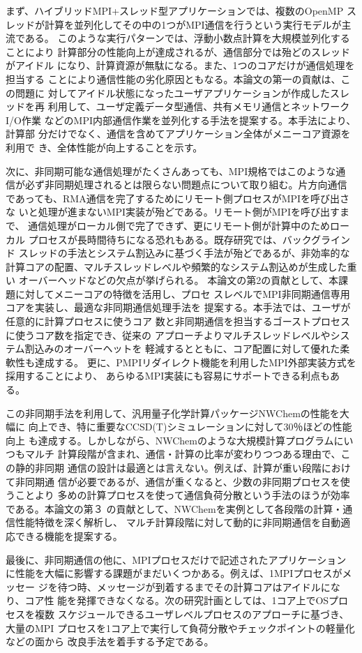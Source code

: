 まず、ハイブリッドMPI+スレッド型アプリケーションでは、複数のOpenMP
スレッドが計算を並列化してその中の1つがMPI通信を行うという実行モデルが主流である。
このような実行パターンでは、浮動小数点計算を大規模並列化することにより
計算部分の性能向上が達成されるが、通信部分では殆どのスレッドがアイドル
になり、計算資源が無駄になる。また、1つのコアだけが通信処理を担当する
ことにより通信性能の劣化原因ともなる。本論文の第一の貢献は、この問題に
対してアイドル状態になったユーザアプリケーションが作成したスレッドを再
利用して、ユーザ定義データ型通信、共有メモリ通信とネットワークI/O作業
などのMPI内部通信作業を並列化する手法を提案する。本手法により、計算部
分だけでなく、通信を含めてアプリケーション全体がメニーコア資源を利用で
き、全体性能が向上することを示す。

次に、非同期可能な通信処理がたくさんあっても、MPI規格ではこのような通
信が必ず非同期処理されるとは限らない問題点について取り組む。片方向通信
であっても、RMA通信を完了するためにリモート側プロセスがMPIを呼び出さな
いと処理が進まないMPI実装が殆どである。リモート側がMPIを呼び出すまで、
通信処理がローカル側で完了できず、更にリモート側が計算中のためローカル
プロセスが長時間待ちになる恐れもある。既存研究では、バックグラインド
スレッドの手法とシステム割込みに基づく手法が殆どであるが、非効率的な
計算コアの配置、マルチスレッドレベルや頻繁的なシステム割込めが生成した重い
オーバーヘッドなどの欠点が挙げられる。
本論文の第2の貢献として、本課題に対してメニーコアの特徴を活用し、プロセ
スレベルでMPI非同期通信専用コアを実装し、最適な非同期通信処理手法を
提案する。本手法では、ユーザが任意的に計算プロセスに使うコア
数と非同期通信を担当するゴーストプロセスに使うコア数を指定でき、従来の
アプローチよりマルチスレッドレベルやシステム割込みのオーバーヘットを
軽減するとともに、コア配置に対して優れた柔軟性も達成する。
更に、PMPIリダイレクト機能を利用したMPI外部実装方式を採用することにより、
あらゆるMPI実装にも容易にサポートできる利点もある。

この非同期手法を利用して、汎用量子化学計算パッケージNWChemの性能を大幅に
向上でき、特に重要なCCSD(T)シミュレーションに対して30％ほどの性能向上
も達成する。しかしながら、NWChemのような大規模計算プログラムにいつもマルチ
計算段階が含まれ、通信・計算の比率が変わりつつある理由で、この静的非同期
通信の設計は最適とは言えない。例えば、計算が重い段階におけて非同期通
信が必要であるが、通信が重くなると、少数の非同期プロセスを使うことより
多めの計算プロセスを使って通信負荷分散という手法のほうが効率である。本論文の第３
の貢献として、NWChemを実例として各段階の計算・通信性能特徴を深く解析し、
マルチ計算段階に対して動的に非同期通信を自動適応できる機能を提案する。

最後に、非同期通信の他に、MPIプロセスだけで記述されたアプリケーション
に性能を大幅に影響する課題がまだいくつかある。例えば、1MPIプロセスがメッセー
ジを待つ時、メッセージが到着するまでその計算コアはアイドルになり、コア性
能を発揮できなくなる。次の研究計画としては、1コア上でOSプロセスを複数
スケジュールできるユーザレベルプロセスのアプローチに基づき、大量のMPI
プロセスを1コア上で実行して負荷分散やチェックポイントの軽量化などの面から
改良手法を着手する予定である。
